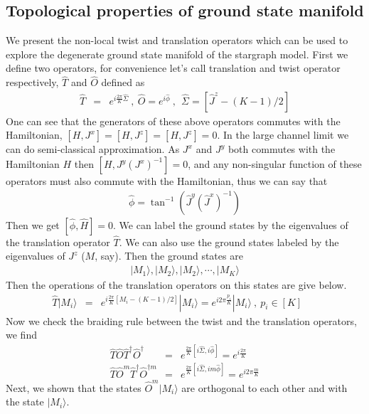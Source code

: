 \documentclass[reprint,prb,superscriptaddress]{revtex4-1}
\begin{document}
\subsection{Topological properties of ground state manifold}
\label{sec:topo_ground_state}
\noindent We present the non-local twist and translation operators which can be used to explore the degenerate ground state manifold of the stargraph model. First we define two operators, for convenience let's call translation and twist operator respectively, $\hat{T}$ and $\hat{O}$ defined as 
\begin{eqnarray}
\hat{T} &=& e^{i\frac{2\pi}{K} \hat{\Sigma}} ~,~\hat{O} = e^{i\hat{\phi}}~,~~\hat{\Sigma}=[\hat{J}^z-(K-1)/2]
\end{eqnarray}
One can see that the generators of these above operators commutes with the Hamiltonian, $[H,J^x]=[H,J^z]=[H,J^z]=0$. In the large channel limit we can do semi-classical approximation. As $J^x$ and $J^y$ both commutes with the Hamiltonian $H$ then $[H,J^y{(J^{x})}^{-1}]=0$, and any non-singular function of these operators must also commute with the Hamiltonian, thus we can say that
\begin{eqnarray}
\hat{\phi}=\tan^{-1}(\hat{J}^y(\hat{J}^x)^{-1})
\end{eqnarray}
Then we get $[\hat{\phi},\hat{H}]=0$. We can label the ground states by the eigenvalues of the translation operator $\hat{T}$. We can also use the ground states labeled by the eigenvalues of $J^z$ ($M$, say). Then the ground states are 
\begin{eqnarray}
|M_1\rangle,|M_2\rangle,|M_2\rangle,\cdots ,|M_K\rangle
\end{eqnarray}
Then the operations of the translation operators on this states are give below.
\begin{eqnarray}
\hat{T}|M_i\rangle &=& e^{i\frac{2\pi}{K} [M_i-(K-1)/2]} |M_i\rangle = e^{i2\pi\frac{p_i}{K} } |M_i\rangle~,~p_i\in[K]~~~~~~~
\end{eqnarray}
Now we check the braiding rule between the twist and the translation operators, we find
\begin{eqnarray}
\hat{T}\hat{O}\hat{T}^{\dagger}\hat{O}^{\dagger} &=& e^{\frac{2\pi }{K}[i\hat{\Sigma},i\hat{\phi}]}=e^{i\frac{2\pi }{K}} \nonumber\\
\hat{T}\hat{O}^m\hat{T}^{\dagger}\hat{O}^{\dagger m} &=& e^{\frac{2\pi }{K}[i\hat{\Sigma},im\hat{\phi}]}=e^{i2\pi \frac{m}{K}}
\end{eqnarray}
Next, we shown that the states $\hat{O}^m |M_i\rangle$ are orthogonal to each other and with the state $|M_i\rangle$.
\end{document}
